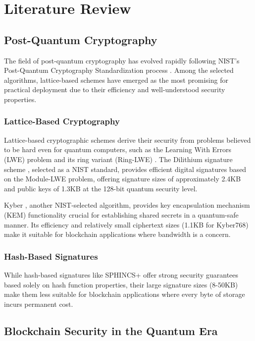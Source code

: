 \documentclass[12pt,a4paper]{article}
\begin{document}
\section{Literature Review}

\subsection{Post-Quantum Cryptography}

The field of post-quantum cryptography has evolved rapidly following NIST's Post-Quantum Cryptography Standardization process \cite{nist2022}. Among the selected algorithms, lattice-based schemes have emerged as the most promising for practical deployment due to their efficiency and well-understood security properties.

\subsubsection{Lattice-Based Cryptography}

Lattice-based cryptographic schemes derive their security from problems believed to be hard even for quantum computers, such as the Learning With Errors (LWE) problem \cite{regev2009} and its ring variant (Ring-LWE) \cite{lyubashevsky2010}. The Dilithium signature scheme \cite{ducas2018}, selected as a NIST standard, provides efficient digital signatures based on the Module-LWE problem, offering signature sizes of approximately 2.4KB and public keys of 1.3KB at the 128-bit quantum security level.

Kyber \cite{bos2018}, another NIST-selected algorithm, provides key encapsulation mechanism (KEM) functionality crucial for establishing shared secrets in a quantum-safe manner. Its efficiency and relatively small ciphertext sizes (1.1KB for Kyber768) make it suitable for blockchain applications where bandwidth is a concern.

\subsubsection{Hash-Based Signatures}

While hash-based signatures like SPHINCS+ \cite{bernstein2019} offer strong security guarantees based solely on hash function properties, their large signature sizes (8-50KB) make them less suitable for blockchain applications where every byte of storage incurs permanent cost.

\subsection{Blockchain Security in the Quantum Era}
\end{document}
